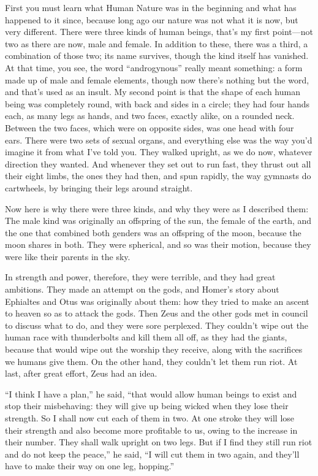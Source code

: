 First you must learn what Human Nature was in the beginning and what has
happened to it since, because long ago our nature was not what it is
now, but very different. There were three kinds of human beings, that’s
my first point---not two as there are now, male and female. In 
addition to these, there was a third, a combination of those two; its
name survives, though the kind itself has vanished. At that time, you
see, the word “androgynous” really meant something: a form made up of
male and female elements, though now there’s nothing but the word, and
that’s used as an insult. My second point is that the shape of each
human being was completely round, with back and sides in a circle; they
had four hands each, as many legs as hands, and two faces, exactly
alike, on a rounded  neck. Between the two faces, which
were on opposite sides, was one head with four ears. There were two sets
of sexual organs, and everything else was the way you’d imagine it from
what I’ve told you. They walked upright, as we do now, whatever
direction they wanted. And whenever they set out to run fast, they
thrust out all their eight limbs, the ones they had then, and spun
rapidly, the way gymnasts do cartwheels, by bringing their legs around
straight.

Now here is why there were three kinds, and why they were as I 
described them: The male kind was originally an offspring of the sun,
the female of the earth, and the one that combined both genders was an
offspring of the moon, because the moon shares in both. They were
spherical, and so was their motion, because they were like their parents
in the sky.

In strength and power, therefore, they were terrible, and they had great
ambitions. They made an attempt on the gods, and Homer’s story about
Ephialtes and Otus was originally about them: how they tried to make an
ascent to heaven so as to attack the
gods. Then Zeus and
the other gods  met in council to discuss what to do, and they
were sore perplexed. They couldn’t wipe out the human race with
thunderbolts and kill them all off, as they had the giants, because that
would wipe out the worship they receive, along with the sacrifices we
humans give them. On the other hand, they couldn’t let them run riot. At
last, after great effort, Zeus had an idea.

“I think I have a plan,” he said, “that would allow human beings to
exist and stop their misbehaving: they will give up being wicked when
 they lose their strength. So I shall now cut each of them in
two. At one stroke they will lose their strength and also become more
profitable to us, owing to the increase in their number. They shall walk
upright on two legs. But if I find they still run riot and do not keep
the peace,” he said, “I will cut them in two again, and they’ll have to
make their way on one leg, hopping.”

